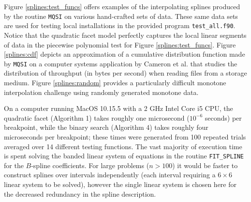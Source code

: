 Figure \ref{splines:test_funcs} offers examples of the interpolating splines produced by the
routine {\tt MQSI} on various hand-crafted sets of data. These same
data sets are used for testing local installations in the provided
program {\tt test\_all.f90}. Notice that the quadratic facet model
perfectly captures the local linear segments of data in the piecewise
polynomial test for Figure \ref{splines:test_funcs}. Figure
\ref{splines:cdf} depicts an approximation of a
cumulative distribution function made by {\tt MQSI} on a computer
systems application by Cameron et al. \cite{cameron2019moana} that studies the
distribution of throughput (in bytes per second) when reading files
from a storage medium. Figure \ref{splines:random} provides a particularly difficult
monotone interpolation challenge using randomly generated monotone
data.

On a computer running MacOS 10.15.5 with a 2 GHz Intel Core i5 CPU, the
quadratic facet (Algorithm 1) takes roughly one microsecond ($10^{-6}$
seconds) per breakpoint, while the binary search (Algorithm 4) takes roughly
four microseconds per breakpoint; these times were generated from 100
repeated trials averaged over 14 different testing functions.  The vast
majority of execution time is spent solving the banded linear system of
equations in the routine {\tt FIT\_SPLINE} for the $B$-spline coefficients.
For large problems ($n > 100$) it would be faster to construct splines
over intervals independently (each interval requiring a $6 \times 6$ linear
system to be solved), however the single linear system is chosen here for
the decreased redundancy in the spline description.
